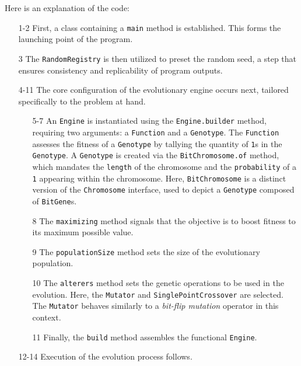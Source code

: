   Here is an explanation of the code:

  \begin{enumerate}
    \item[1-2] First, a class containing a \texttt{main} method is established.
      This forms the launching point of the program.
    \item[3] The \texttt{RandomRegistry} is then utilized to preset the random 
      seed, a step that ensures consistency and replicability of program 
      outputs.
    \item[4-11] The core configuration of the evolutionary engine occurs next, 
      tailored specifically to the problem at hand.
      \begin{enumerate}
        \item[5-7] An \texttt{Engine} is instantiated using the 
          \texttt{Engine.builder} method, requiring two arguments: a 
          \texttt{Function} and a \texttt{Genotype}.
          The \texttt{Function} assesses the fitness of a \texttt{Genotype} by 
          tallying the quantity of \texttt{1}s in the \texttt{Genotype}.
          A \texttt{Genotype} is created via the \texttt{BitChromosome.of} 
          method, which mandates the \texttt{length} of the chromosome and the 
          \texttt{probability} of a \texttt{1} appearing within the chromosome.
          Here, \texttt{BitChromosome} is a distinct version of the 
          \texttt{Chromosome} interface, used to depict a \texttt{Genotype} 
          composed of \texttt{BitGene}s.
        \item[8] The \texttt{maximizing} method signals that the objective is 
          to boost fitness to its maximum possible value.
        \item[9] The \texttt{populationSize} method sets the size of the 
          evolutionary population.
        \item[10] The \texttt{alterers} method sets the genetic operations to 
          be used in the evolution.
          Here, the \texttt{Mutator} and \texttt{SinglePointCrossover} are 
          selected.
          The \texttt{Mutator} behaves similarly to a \textit{bit-flip 
          mutation} operator in this context.
        \item[11] Finally, the \texttt{build} method assembles the functional 
          \texttt{Engine}.
      \end{enumerate}
    \item[12-14] Execution of the evolution process follows.
      \begin{enumerate}

\end{enumerate}
\end{enumerate}
